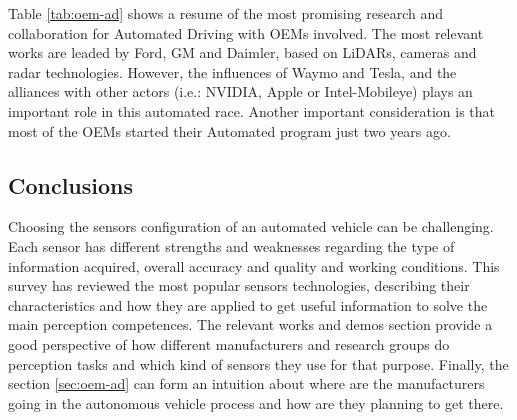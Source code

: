 Table \ref{tab:oem-ad} shows a resume of the most promising research and 
collaboration for Automated Driving with OEMs involved. The most relevant works 
are leaded by Ford, GM and Daimler, based on LiDARs, cameras and radar 
technologies. However, the influences of Waymo and Tesla, and the alliances 
with other actors (i.e.: NVIDIA, Apple or Intel-Mobileye) plays an important 
role in this automated race. Another important consideration is that most of the 
OEMs started their Automated program just two years ago.

\subsection{Conclusions}

Choosing the sensors configuration of an automated vehicle can be challenging.
Each sensor has different strengths and weaknesses regarding
the type of information acquired, overall accuracy and quality and working conditions. 
This survey has reviewed the most popular sensors technologies, 
describing their characteristics and how they are applied to get useful information 
to solve the main perception competences.
The relevant works and demos section provide a good perspective of how different 
manufacturers and research groups do perception tasks and which kind of sensors 
they use for that purpose. 
Finally, the section \ref{sec:oem-ad} can form an intuition about where are the 
manufacturers going in the autonomous vehicle process and how are they planning 
to get there.



